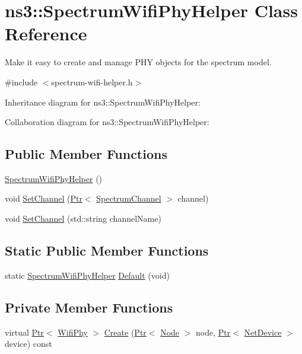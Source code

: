 \hypertarget{classns3_1_1SpectrumWifiPhyHelper}{}\section{ns3\+:\+:Spectrum\+Wifi\+Phy\+Helper Class Reference}
\label{classns3_1_1SpectrumWifiPhyHelper}


Make it easy to create and manage P\+HY objects for the spectrum model.  




{\ttfamily \#include $<$spectrum-\/wifi-\/helper.\+h$>$}



Inheritance diagram for ns3\+:\+:Spectrum\+Wifi\+Phy\+Helper\+:


Collaboration diagram for ns3\+:\+:Spectrum\+Wifi\+Phy\+Helper\+:
\subsection*{Public Member Functions}
\begin{DoxyCompactItemize}
\item 
\hyperlink{classns3_1_1SpectrumWifiPhyHelper_ac36ab8e996f119063c76bb4b40db2495}{Spectrum\+Wifi\+Phy\+Helper} ()
\item 
void \hyperlink{classns3_1_1SpectrumWifiPhyHelper_a537ad482662626d45c1b041c6d359dd5}{Set\+Channel} (\hyperlink{classns3_1_1Ptr}{Ptr}$<$ \hyperlink{classns3_1_1SpectrumChannel}{Spectrum\+Channel} $>$ channel)
\item 
void \hyperlink{classns3_1_1SpectrumWifiPhyHelper_a34d1134e25ddf658868a7f5f924e14f9}{Set\+Channel} (std\+::string channel\+Name)
\end{DoxyCompactItemize}
\subsection*{Static Public Member Functions}
\begin{DoxyCompactItemize}
\item 
static \hyperlink{classns3_1_1SpectrumWifiPhyHelper}{Spectrum\+Wifi\+Phy\+Helper} \hyperlink{classns3_1_1SpectrumWifiPhyHelper_a0a79c81b5d5d9ac8bbb56c718ef14be9}{Default} (void)
\end{DoxyCompactItemize}
\subsection*{Private Member Functions}
\begin{DoxyCompactItemize}
\item 
virtual \hyperlink{classns3_1_1Ptr}{Ptr}$<$ \hyperlink{classns3_1_1WifiPhy}{Wifi\+Phy} $>$ \hyperlink{classns3_1_1SpectrumWifiPhyHelper_a32620f5a77158f9df5d02689860de062}{Create} (\hyperlink{classns3_1_1Ptr}{Ptr}$<$ \hyperlink{classns3_1_1Node}{Node} $>$ node, \hyperlink{classns3_1_1Ptr}{Ptr}$<$ \hyperlink{classns3_1_1NetDevice}{Net\+Device} $>$ device) const 
\end{DoxyCompactItemize}
